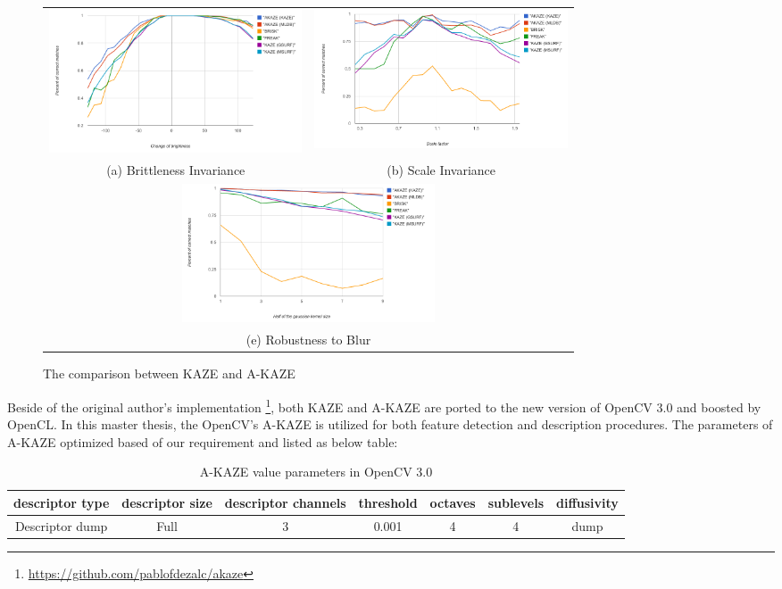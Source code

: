 \begin{figure}[H]
\begin{tabular}{cc}
  \includegraphics[width=75mm]{figures/brithness_akaze} &  \includegraphics[width=75mm]{figures/scale_akaze} \\
(a) Brittleness Invariance & (b) Scale Invariance \\[6pt]
\multicolumn{2}{c}{\includegraphics[width=75mm]{figures/blur_akaze} }\\
\multicolumn{2}{c}{(e) Robustness to Blur}
\end{tabular}
\caption{The comparison between KAZE and A-KAZE}\label{fig:compare_kaze_and_A-kaze}
\end{figure}

Beside of the original author's implementation \footnote{\url{https://github.com/pablofdezalc/akaze}}, both KAZE and A-KAZE are ported to the new version of OpenCV 3.0 and boosted by OpenCL. In this master thesis, the OpenCV's A-KAZE is utilized for both feature detection and description procedures. The parameters of A-KAZE optimized based of our requirement and listed as below table:

\begin{table}[H]
  \caption{A-KAZE value parameters in OpenCV 3.0}
  \begin{tabular}{| c | c | c | c | c | c | c |}
      \hline
      descriptor type & descriptor size & descriptor channels & threshold & octaves & sublevels & diffusivity \\ \hline \hline
      Descriptor dump & Full & 3 & 0.001 & 4 & 4 & dump \\ \hline
  \end{tabular}
\end{table}

